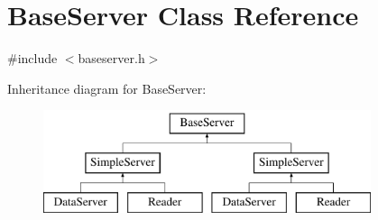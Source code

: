 \hypertarget{classBaseServer}{\section{Base\-Server Class Reference}
\label{classBaseServer}
}


{\ttfamily \#include $<$baseserver.\-h$>$}

Inheritance diagram for Base\-Server\-:\begin{figure}[H]
\begin{center}
\leavevmode
\includegraphics[height=3.000000cm]{classBaseServer}
\end{center}
\end{figure}
